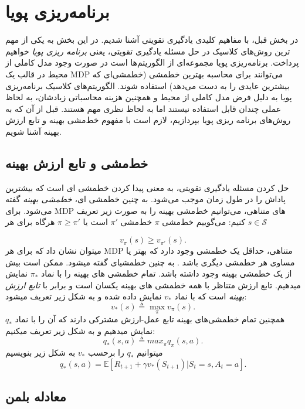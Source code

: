 \section{برنامه‌ریزی پویا}
در بخش قبل، با مفاهیم کلیدی یادگیری تقویتی آشنا شدیم. در این بخش به یکی از مهم ترین روش‌های کلاسیک در حل مسئله یادگیری تقویتی، یعنی 
\textit{برنامه ریزی پویا}
خواهیم پرداخت. برنامه‌ریزی پویا
 مجموعه‌ای از الگوریتم‌ها است در صورت وجود مدل کاملی از محیط در قالب یک 
MDP
 می‌توانند برای محاسبه بهترین خط\nf مشی (خط\nf مشی‌ای که بیشترین عایدی را به دست می‌دهد)   استفاده شوند.
الگوریتم‌های کلاسیک برنامه‌ریزی پویا به دلیل فرض
مدل کاملی از محیط و همچنین هزینه محاسباتی زیادشان، به لحاظ عملی چندان قابل استفاده نیستند اما به لحاظ نظری مهم هستند. قبل از آن که به روش‌های برنامه ریزی پویا بپردازیم، لازم است با مفهوم خط‌مشی بهینه و تابع ارزش بهینه آشنا شویم.
\subsection{خط‌مشی و تابع ارزش بهینه}
حل کردن مسئله یادگیری تقویتی، به معنی پیدا کردن خط\nf مشی ای است که بیشترین پاداش را در طول زمان موجب می‌شود.	به چنین خط\nf مشی ای، 
\textit{خط\nf مشی بهینه} 
گفته می‌شود. برای
 MDP‌ 
 های متناهی، می‌توانیم خط‌مشی بهینه را به صورت زیر تعریف کنیم:
می‌گوییم خط‌مشی $\pi$  خط‌مشی 
$\pi'$
است یا
$\pi \ge \pi'$
هرگاه برای هر 
$s \in \mathcal{S}$

$$v_\pi(s) \ge v_{\pi'}(s).$$
 می\nf توان نشان داد که برای هر MDP متناهی، حداقل یک خط\nf مشی وجود دارد که بهتر یا مساوی هر خط\nf مشی دیگری باشد
\cite{suttonbook}.
 به چنین خط\nf مشی\nf ای  گفته می\nf  شود. ممکن است بیش از یک خط\nf مشی بهینه وجود داشته باشد. تمام خط\nf مشی\nf‌ های بهینه را با نماد $\pi_*$  نمایش می\nf دهیم. تابع ارزش متناظر با همه خط\nf مشی\nf‌ های بهینه یکسان است و برابر با 
\textit{تابع ارزش بهینه}
 است که با نماد $v_*$ نمایش داده شده و به شکل زیر تعریف می\nf شود:
$$v_*(s) \triangleq \max_{\pi} v_\pi(s).$$
همچنین تمام خط\nf مشی\nf ‌های بهینه تابع عمل-ارزش مشترکی دارند که آن را با نماد $q_*$ نمایش می\nf دهیم و به شکل زیر تعریف می\nf کنیم:
$$q_*(s,a) \triangleq max_{\pi} q_\pi(s,a).$$
می\nf توانیم $q_*$ را برحسب $v_*$ به شکل زیر بنویسیم
\begin{equation}
q_* (s,a) = \mathbb{E}[R_{t+1} + \gamma v_*(S_{t+1})| S_t=s, A_t=a].
\end{equation}

\subsection{معادله بلمن}

